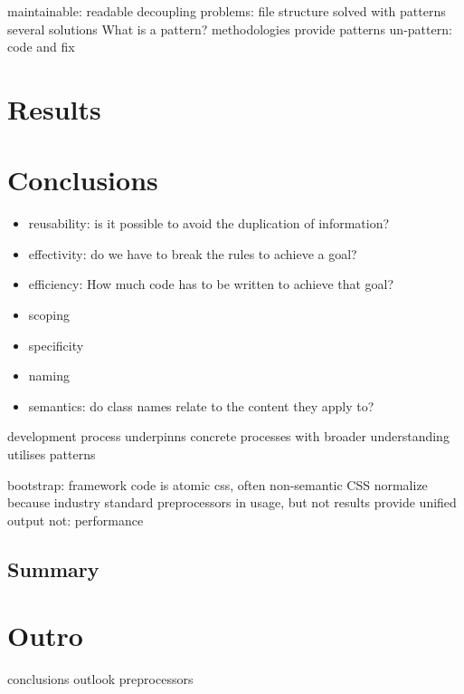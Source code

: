     maintainable: readable
decoupling
problems:
file structure
solved with patterns
several solutions
What is a pattern?
methodologies provide patterns
un-pattern: code and fix


\chapter{Results}

\chapter{Conclusions}









\begin{itemize}
    \item reusability: is it possible to avoid the duplication of information?
    \item effectivity: do we have to break the rules to achieve a goal?
    \item efficiency: How much code has to be written to achieve that goal?
    \item scoping
    \item specificity
    \item naming
    \item semantics: do class names relate to the content they apply to?
\end{itemize}





development process underpinns concrete processes with broader understanding
utilises patterns


bootstrap: framework code is atomic css, often non-semantic
CSS normalize because industry standard
preprocessors in usage, but not results
provide unified output
not: performance
\section{Summary}
% 


\chapter{Outro}
conclusions
outlook
preprocessors

